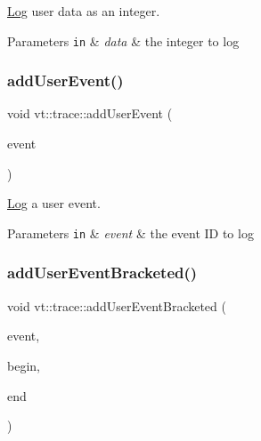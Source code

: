 \hyperlink{structvt_1_1trace_1_1_log}{Log} user data as an integer. 


\begin{DoxyParams}[1]{Parameters}
\mbox{\tt in}  & {\em data} & the integer to log \\
\hline
\end{DoxyParams}
\mbox{\label{namespacevt_1_1trace_ac973a9573bd3cc0a3fead674a4551ac5}} 
\subsubsection{\texorpdfstring{add\+User\+Event()}{addUserEvent()}}
{\footnotesize\ttfamily void vt\+::trace\+::add\+User\+Event (\begin{DoxyParamCaption}\item[{\hyperlink{namespacevt_1_1trace_a5908920d051c144c89f17c69ed262350}{User\+Event\+I\+D\+Type}}]{event }\end{DoxyParamCaption})}



\hyperlink{structvt_1_1trace_1_1_log}{Log} a user event. 


\begin{DoxyParams}[1]{Parameters}
\mbox{\tt in}  & {\em event} & the event ID to log \\
\hline
\end{DoxyParams}
\mbox{\label{namespacevt_1_1trace_ab090a5c9eae800c6820c88b3fe56c9c8}} 
\subsubsection{\texorpdfstring{add\+User\+Event\+Bracketed()}{addUserEventBracketed()}}
{\footnotesize\ttfamily void vt\+::trace\+::add\+User\+Event\+Bracketed (\begin{DoxyParamCaption}\item[{\hyperlink{namespacevt_1_1trace_a5908920d051c144c89f17c69ed262350}{User\+Event\+I\+D\+Type}}]{event,  }\item[{double}]{begin,  }\item[{double}]{end }\end{DoxyParamCaption})}



